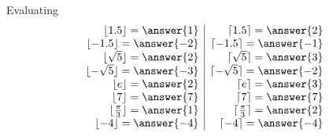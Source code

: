 \documentclass{ximera}
\begin{document}
\begin{exercise} Evaluating \\

\[
\begin{array}{r|r}
\lfloor 1.5 \rfloor  =  \answer{1}            &      \lceil 1.5 \rceil  =  \answer{2}  \\
\lfloor -1.5 \rfloor  =  \answer{-2}          &      \lceil -1.5 \rceil  =  \answer{-1}  \\
\lfloor \sqrt{5} \rfloor  =  \answer{2}       &      \lceil \sqrt{5} \rceil  =  \answer{3}  \\
\lfloor -\sqrt{5} \rfloor  =  \answer{-3}     &      \lceil -\sqrt{5} \rceil  =  \answer{-2}  \\
\lfloor e \rfloor  =  \answer{2}              &      \lceil e \rceil  =  \answer{3}  \\
\lfloor  7 \rfloor  =  \answer{7}             &      \lceil 7 \rceil  =  \answer{7}  \\
\lfloor \frac{\pi}{3} \rfloor  =  \answer{1}  &    \lceil \frac{\pi}{3} \rceil  =  \answer{2}  \\
\lfloor -4 \rfloor  =  \answer{-4}            &     \lceil -4 \rceil  =  \answer{-4}  
\end{array}
\]

\end{exercise}
\end{document}

